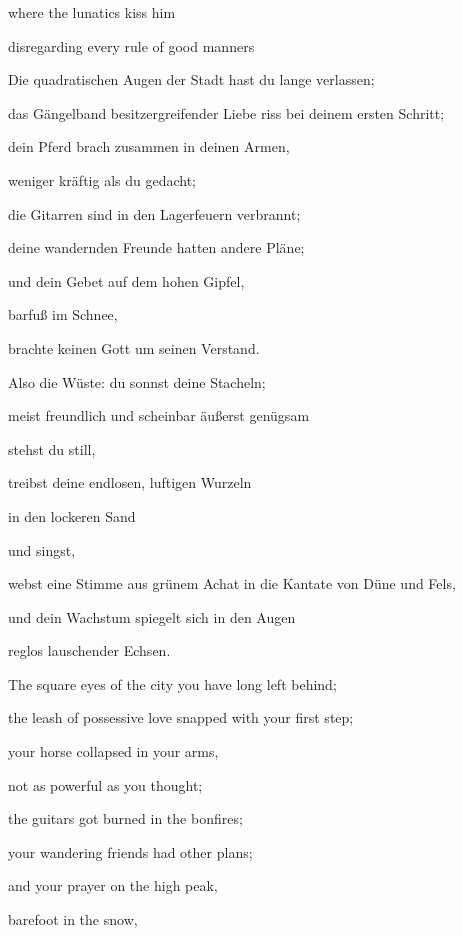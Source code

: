 where the lunatics kiss him

disregarding every rule of good manners


\bigskip



\bigskip

Die quadratischen Augen der Stadt hast du lange verlassen;

das Gängelband besitzergreifender Liebe riss bei deinem ersten Schritt;

dein Pferd brach zusammen in deinen Armen,

weniger kräftig als du gedacht;

die Gitarren sind in den Lagerfeuern verbrannt;

deine wandernden Freunde hatten andere Pläne;

und dein Gebet auf dem hohen Gipfel,

barfuß im Schnee,

brachte keinen Gott um seinen Verstand.


\bigskip

Also die Wüste: du sonnst deine Stacheln;

meist freundlich und scheinbar äußerst genügsam

stehst du still,

treibst deine endlosen, luftigen Wurzeln

in den lockeren Sand

und singst,

webst eine Stimme aus grünem Achat in die Kantate von Düne und Fels,

und dein Wachstum spiegelt sich in den Augen

reglos lauschender Echsen.


\bigskip



\bigskip

The square eyes of the city you have long left behind;

the leash of possessive love snapped with your first step;

your horse collapsed in your arms,

not as powerful as you thought;

the guitars got burned in the bonfires;

your wandering friends had other plans;

and your prayer on the high peak,

barefoot in the snow,

